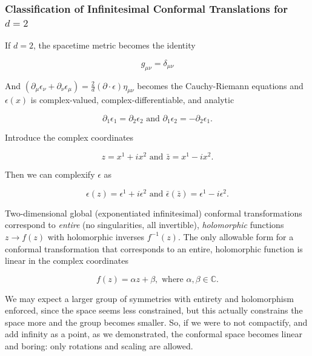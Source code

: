 \subsubsection*{Classification of Infinitesimal Conformal Translations for $d=2$}

\noindent If $d=2$, the spacetime metric becomes the identity

\begin{equation}
g_{\mu\nu} = \delta_{\mu\nu}
\end{equation}

\noindent And $(\partial_\mu \epsilon_\nu + \partial_\nu \epsilon_\mu) = \frac{2}{d} (\partial \cdot \epsilon) \eta_{\mu\nu}$ becomes the Cauchy-Riemann equations and $\epsilon(x)$ is complex-valued, complex-differentiable, and analytic

\begin{equation}
\partial_1 \epsilon_1 = \partial_2 \epsilon_2 \text{ and } \partial_1 \epsilon_2 = - \partial_2 \epsilon_1.
\end{equation}

\noindent Introduce the complex coordinates

\begin{equation}
z = x^1 + i x^2 \text{ and } \bar{z} = x^1 - i x^2.
\end{equation}

\noindent Then we can complexify $\epsilon$ as

\begin{equation}
\epsilon(z) = \epsilon^1 + i \epsilon^2 \text{ and } \bar{\epsilon}({\bar{z}}) = \epsilon^1 - i \epsilon^2.
\end{equation}

\noindent Two-dimensional global (exponentiated infinitesimal) conformal transformations correspond to \textit{entire} (no singularities, all invertible), \textit{holomorphic} functions $z \rightarrow f(z)$ with holomorphic inverses $f^{-1} (z)$. The only allowable form for a conformal transformation that corresponds to an entire, holomorphic function is linear in the complex coordinates

\begin{equation}
f(z) = \alpha z + \beta, \text{ where } \alpha, \beta \in \mathbb{C}.
\end{equation}

\noindent We may expect a larger group of symmetries with entirety and holomorphism enforced, since the space seems less constrained, but this actually constrains the space more and the group becomes smaller. So, if we were to not compactify, and add infinity as a point, as we demonstrated, the conformal space becomes linear and boring: only rotations and scaling are allowed.\\


